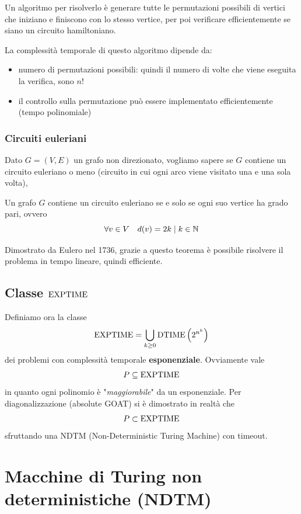 Un algoritmo per risolverlo è generare tutte le permutazioni possibili di vertici che iniziano e finiscono con lo stesso vertice, per poi verificare efficientemente se siano un circuito hamiltoniano.

La complessità temporale di questo algoritmo dipende da: 
\begin{itemize}
	\item numero di permutazioni possibili: quindi il numero di volte che viene eseguita la verifica, sono $n!$
	\item il controllo sulla permutazione può essere implementato efficientemente (tempo polinomiale)
\end{itemize}

\subsubsection{Circuiti euleriani}

Dato $G = (V,E)$ un grafo non direzionato, vogliamo sapere se $G$ contiene un circuito euleriano o meno (circuito in cui ogni arco viene visitato una e una sola volta),\\

\begin{theor}
	Un grafo $G$ contiene un circuito euleriano se e solo se ogni suo vertice ha grado pari, ovvero
	$$ \forall v \in V \quad d(v) = 2k \mid k \in \mathbb{N} $$
\end{theor}

Dimostrato da Eulero nel 1736, grazie a questo teorema è possibile risolvere il problema in tempo lineare, quindi efficiente.

\subsection{Classe $\text{EXPTIME}$}

Definiamo ora la classe
$$ \text{EXPTIME} = \bigcup_{k \geq 0} \text{DTIME} \left(2^{n^k}\right)$$
dei problemi con complessità temporale \textbf{esponenziale}. Ovviamente vale
$$ P \subseteq \text{EXPTIME} $$
in quanto ogni polinomio è "\textit{maggiorabile}" da un esponenziale. Per diagonalizzazione (absolute GOAT) si è dimostrato in realtà che
$$ P \subset \text{EXPTIME} $$
sfruttando una NDTM (Non-Deterministic Turing Machine) con timeout.

\section{Macchine di Turing non deterministiche (NDTM)}

